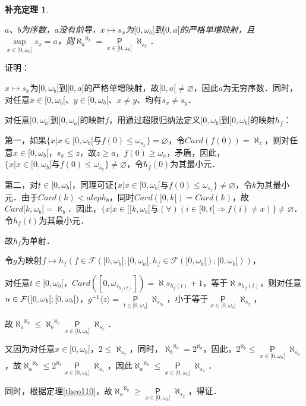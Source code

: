 \documentclass[12pt, a4paper, oneside]{book}
\newtheorem{cor}{补充定理}
\begin{document}
			\begin{cor}\label{cor383}
				\hfill\par
				$a$、$b$为序数，$a$没有前导，$x\mapsto s_x$为$[0, \omega_b[$到$[0, a[$的严格单增映射，且$\mathop{sup}\limits_{x\in [0, \omega_b[}s_x=a$，则${\aleph_a}^{\aleph_b}=\mathop{\mathsf{P}}\limits_{x\in [0, \omega_b[}\aleph_{s_x}$．
			\end{cor}
			证明：
			\par
			$x\mapsto s_x$为$[0, \omega_b[$到$[0, a[$的严格单增映射，故$[0, a[\neq \varnothing$，因此$a$为无穷序数．同时，对任意$x\in [0, \omega_b[$、$y\in [0, \omega_b[$、$x\neq y$、均有$s_x\neq s_y$．
			\par
			对任意$[0, \omega_b[$到$[0, \omega_a[$的映射$f$，用通过超限归纳法定义$[0, \omega_b[$到$[0, \omega_b[$的映射$h_f$：
			\par
			第一，如果$\{x|x\in [0, \omega_b[\text{与}f(0)\leq \omega_{s_x}\}=\varnothing$，令$Card(f(0))=\aleph_z$，则对任意$x\in [0, \omega_b[$，$s_x\leq z$，故$z\geq a$，$f(0)\geq \omega_a$，矛盾，因此，$\{x|x\in [0, \omega_b[\text{与}f(0)\leq \omega_{s_x}\}\neq\varnothing$，令$h_f(0)$为其最小元．
			\par
			第二，对$t\in [0, \omega_b[$，同理可证$\{x|x\in [0, \omega_b[\text{与}f(0)\leq \omega_{s_x}\}\neq\varnothing$，令$k$为其最小元．由于$Card(k)<aleph_b$，同时$Card([0, k[)=Card(k)$，故$Card[k, \omega_b[=\aleph_b$．因此，$\{x|x\in [[k, \omega_b[\text{与}(\forall)(i\in [0, t[\Rightarrow f(i)\neq x)\}\neq \varnothing$．令$h_f(t)$为其最小元．
			\par
			故$h_f$为单射．
			\par
			令$g$为映射$f\mapsto h_f(f\in \mathcal{F}([0, \omega_b[; [0, \omega_a[, h_f\in \mathcal{F}([0, \omega_b[); [0, \omega_b[))$，
			\par
			对任意$t\in [0, \omega_b[$，$Card([0, \omega_{s_{h_f(t)}}])=\aleph{s_{h_f(t)}}+1$，等于$\aleph{s_{h_f(t)}}$，则对任意$u\in\\\mathcal{F}([0, \omega_b[; [0, \omega_b[)$，$g^{-1}\langle z\rangle=\mathop{\mathsf{P}}\limits_{t\in [0, \omega_b[}\aleph_{s_{h_t}}$，小于等于$\mathop{\mathsf{P}}\limits_{x\in [0, \omega_b[}\aleph_{s_x}$，
			\par			
			故${\aleph_a}^{\aleph_b}\leq {\aleph_b}^{\aleph_b}\mathop{\mathsf{P}}\limits_{x\in [0, \omega_b[}\aleph_{s_x}$．
			\par
			又因为对任意$x\in [0, \omega_b[$，$2\leq \aleph_{s_x}$，同时，${\aleph_b}^{\aleph_b}=2^{\aleph_b}$，因此，$2^{\aleph_b}\leq\mathop{\mathsf{P}}\limits_{x\in [0, \omega_b[}\aleph_{s_x}$，故${\aleph_a}^{\aleph_b}\leq 2^{\aleph_b}\mathop{\mathsf{P}}\limits_{x\in [0, \omega_b[}\aleph_{s_x}$，因此${\aleph_a}^{\aleph_b}\leq \mathop{\mathsf{P}}\limits_{x\in [0, \omega_b[}\aleph_{s_x}$．
			\par
			同时，根据定理\ref{theo110}，故${\aleph_a}^{\aleph_b}\geq\mathop{\mathsf{P}}\limits_{x\in [0, \omega_b[}\aleph_{s_x}$，得证．
			
\end{document}
